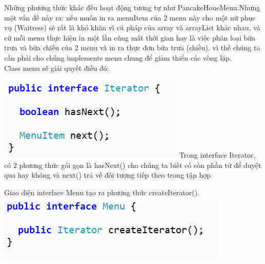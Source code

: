  Những phương thức khác đều hoạt động tương tự như PancakeHoueMenu.Nhưng một vấn đề nảy ra: nếu muốn in ra menuItem của 2 menu này cho một nữ phục vụ (Waitress) sẽ rất là khó khăn vì cú pháp của array và arrayList khác nhau, và cữ mỗi menu thực hiện in một lần cũng mất thời gian hay là việc phân loại bữa trưa và bữa chiều của 2 menu và in ra thực đơn bữa trưa (chiều). vì thế chúng ta cần phải cho chúng implements menu chung để giảm thiểu các vòng lặp.\\
Class menu sẽ giải quyết điều đó: \\
\begin{multicols}{2}
	\includegraphics[width=1\columnwidth]{GALLEYS/images/chapter3/images7}
	Trong interface Iterator, có 2 phương thức gói gọn là hasNext() cho chúng ta biết có còn phần tử để duyệt qua hay không và next() trả về đối tượng tiếp theo trong tập hợp
\end{multicols}
\begin{multicols}{2}
	Giao diện interface Menu tạo ra phương thức createIterator().\\
	\includegraphics[width=1\columnwidth]{GALLEYS/images/chapter3/images8}
\end{multicols}
